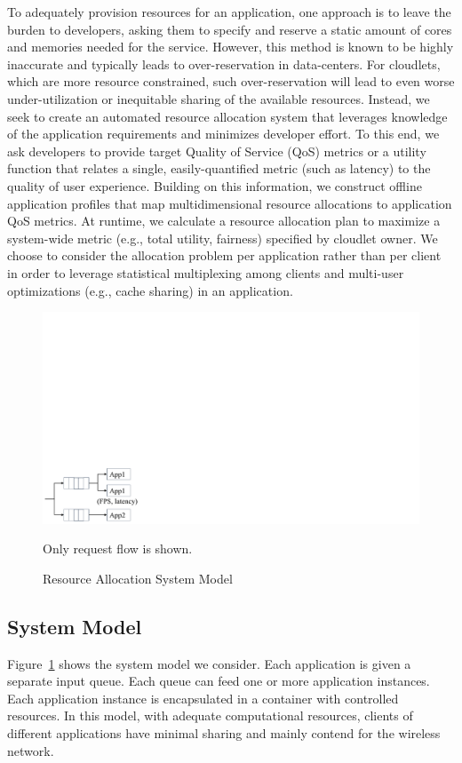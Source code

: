 To adequately provision resources for an application, one approach is
to leave the burden to developers, asking them to specify and reserve
a static amount of cores and memories needed for the service. However,
this method is known to be highly inaccurate and typically leads to
over-reservation in data-centers. For cloudlets, which are more
resource constrained, such over-reservation will lead to even worse
under-utilization or inequitable sharing of the available resources.
Instead, we seek to create an automated resource allocation system
that leverages knowledge of the application requirements and minimizes
developer effort.  To this end, we ask developers to provide target
Quality of Service (QoS) metrics or a utility function that relates a
single, easily-quantified metric (such as latency) to the quality of
user experience.  Building on this information, we construct offline
application profiles that map multidimensional resource allocations to
application QoS metrics.  At runtime, we calculate a resource
allocation plan to maximize a system-wide metric (e.g., total utility,
fairness) specified by cloudlet owner. We choose to consider the
allocation problem per application rather than per client in order to
leverage statistical multiplexing among clients and multi-user
optimizations (e.g., cache sharing) in an application.

\begin{figure}
\centering
\includegraphics[width=0.5\linewidth]{FIGS/fig-allocation-system-model-cropped.pdf}
\begin{captiontext}Only request flow is shown.\end{captiontext}
\caption{\small Resource Allocation System Model}
\label{fig:allocation-system-model}
\vspace{-0.2in}
\end{figure}

\subsection{System Model}
Figure~\ref{fig:allocation-system-model} shows the system model we
consider. Each application is given a separate input queue. Each queue
can feed one or more application instances. Each application instance
is encapsulated in a container with controlled resources. In this
model, with adequate computational resources, clients of different
applications have minimal sharing and mainly contend for the wireless
network.


